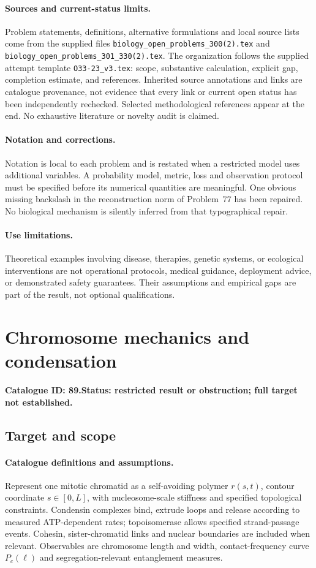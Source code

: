 \documentclass[11pt]{article}
\begin{document}
\paragraph{Sources and current-status limits.}
Problem statements, definitions, alternative formulations and local source lists
come from the supplied files
\texttt{biology\_open\_problems\_300(2).tex} and
\texttt{biology\_open\_problems\_301\_330(2).tex}.
The organization follows the supplied attempt template
\texttt{O33-23\_v3.tex}: scope, substantive calculation, explicit gap,
completion estimate, and references. Inherited source annotations and links are
catalogue provenance, not evidence that every link or current open status has
been independently rechecked. Selected methodological references appear at the
end. No exhaustive literature or novelty audit is claimed.

\paragraph{Notation and corrections.}
Notation is local to each problem and is restated when a restricted model uses
additional variables. A probability model, metric, loss and observation protocol
must be specified before its numerical quantities are meaningful. One obvious
missing backslash in the reconstruction norm of Problem~77 has been repaired.
No biological mechanism is silently inferred from that typographical repair.

\paragraph{Use limitations.}
Theoretical examples involving disease, therapies, genetic systems, or ecological
interventions are not operational protocols, medical guidance, deployment advice,
or demonstrated safety guarantees. Their assumptions and empirical gaps are part
of the result, not optional qualifications.

\setcounter{section}{88}
\section{Chromosome mechanics and condensation}
\label{prob:089}
\noindent\textbf{Catalogue ID: 89.}\quad \textbf{Status: restricted result or obstruction; full target not established.}
\subsection{Target and scope}
\paragraph{Catalogue definitions and assumptions.}
Represent one mitotic chromatid as a self-avoiding polymer $r(s,t)$, contour coordinate $s\in[0,L]$, with nucleosome-scale stiffness and specified topological constraints. Condensin complexes bind, extrude loops and release according to measured ATP-dependent rates; topoisomerase allows specified strand-passage events. Cohesin, sister-chromatid links and nuclear boundaries are included when relevant. Observables are chromosome length and width, contact-frequency curve $P_c(\ell)$ and segregation-relevant entanglement measures.
\end{document}
